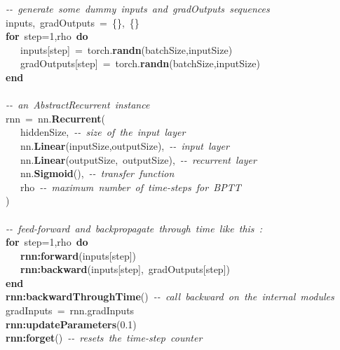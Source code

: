 \noindent
\mbox{}\textit{-\/-\ generate\ some\ dummy\ inputs\ and\ gradOutputs\ sequences} \\
\mbox{}inputs,\ gradOutputs\ =\ \{\},\ \{\} \\
\mbox{}\textbf{for}\ step=1,rho\ \textbf{do} \\
\mbox{}\ \ \ inputs[step]\ =\ torch.\textbf{randn}(batchSize,inputSize) \\
\mbox{}\ \ \ gradOutputs[step]\ =\ torch.\textbf{randn}(batchSize,inputSize) \\
\mbox{}\textbf{end} \\
\mbox{} \\
\mbox{}\textit{-\/-\ an\ AbstractRecurrent\ instance} \\
\mbox{}rnn\ =\ nn.\textbf{Recurrent}( \\
\mbox{}\ \ \ hiddenSize,\ \textit{-\/-\ size\ of\ the\ input\ layer} \\
\mbox{}\ \ \ nn.\textbf{Linear}(inputSize,outputSize),\ \textit{-\/-\ input\ layer} \\
\mbox{}\ \ \ nn.\textbf{Linear}(outputSize,\ outputSize),\ \textit{-\/-\ recurrent\ layer} \\
\mbox{}\ \ \ nn.\textbf{Sigmoid}(),\ \textit{-\/-\ transfer\ function} \\
\mbox{}\ \ \ rho\ \textit{-\/-\ maximum\ number\ of\ time-steps\ for\ BPTT} \\
\mbox{}) \\
\mbox{} \\
\mbox{}\textit{-\/-\ feed-forward\ and\ backpropagate\ through\ time\ like\ this\ :} \\
\mbox{}\textbf{for}\ step=1,rho\ \textbf{do} \\
\mbox{}\ \ \ \textbf{rnn:forward}(inputs[step]) \\
\mbox{}\ \ \ \textbf{rnn:backward}(inputs[step],\ gradOutputs[step]) \\
\mbox{}\textbf{end} \\
\mbox{}\textbf{rnn:backwardThroughTime}()\ \textit{-\/-\ call\ backward\ on\ the\ internal\ modules} \\
\mbox{}gradInputs\ =\ rnn.gradInputs \\
\mbox{}\textbf{rnn:updateParameters}(0.1) \\
\mbox{}\textbf{rnn:forget}()\ \textit{-\/-\ resets\ the\ time-step\ counter}
